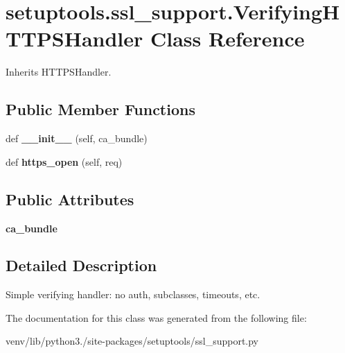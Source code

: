 \hypertarget{classsetuptools_1_1ssl__support_1_1_verifying_h_t_t_p_s_handler}{}\section{setuptools.\+ssl\+\_\+support.\+Verifying\+H\+T\+T\+P\+S\+Handler Class Reference}
\label{classsetuptools_1_1ssl__support_1_1_verifying_h_t_t_p_s_handler}


Inherits H\+T\+T\+P\+S\+Handler.

\subsection*{Public Member Functions}
\begin{DoxyCompactItemize}
\item 
\mbox{\label{classsetuptools_1_1ssl__support_1_1_verifying_h_t_t_p_s_handler_ae4be5c00947e2b0ec9f85a4d07e2dabf}} 
def {\bfseries \+\_\+\+\_\+init\+\_\+\+\_\+} (self, ca\+\_\+bundle)
\item 
\mbox{\label{classsetuptools_1_1ssl__support_1_1_verifying_h_t_t_p_s_handler_a4f4930cabd12d959bf04006803260d69}} 
def {\bfseries https\+\_\+open} (self, req)
\end{DoxyCompactItemize}
\subsection*{Public Attributes}
\begin{DoxyCompactItemize}
\item 
\mbox{\label{classsetuptools_1_1ssl__support_1_1_verifying_h_t_t_p_s_handler_a7b26fd0669813cfb616c35bd285a2efd}} 
{\bfseries ca\+\_\+bundle}
\end{DoxyCompactItemize}


\subsection{Detailed Description}
\begin{DoxyVerb}Simple verifying handler: no auth, subclasses, timeouts, etc.\end{DoxyVerb}
 

The documentation for this class was generated from the following file\+:\begin{DoxyCompactItemize}
\item 
venv/lib/python3./site-\/packages/setuptools/ssl\+\_\+support.\+py\end{DoxyCompactItemize}
